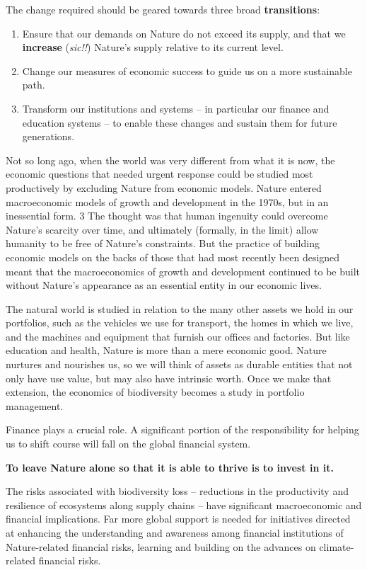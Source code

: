 \documentclass[
]{book}
\begin{document}
The change required should be geared towards three broad \textbf{transitions}:

\begin{enumerate}
\def\labelenumi{(\roman{enumi})}
\item
  Ensure that our demands on Nature do not exceed its supply,
  and that we \textbf{increase} (\emph{sic!!}) Nature's supply relative to its current level.
\item
  Change our measures of economic success to guide us on a
  more sustainable path.
\item
  Transform our institutions and systems -- in particular our
  finance and education systems -- to enable these changes and
  sustain them for future generations.
\end{enumerate}

Not so long ago, when the
world was very different from what it is now, the economic questions that needed urgent
response could be studied most productively by excluding Nature from economic models.
Nature entered macroeconomic models of growth and development in the 1970s, but in an
inessential form. 3 The thought was that human ingenuity could overcome Nature's scarcity over
time, and ultimately (formally, in the limit) allow humanity to be free of Nature's constraints.
But the practice of building economic models on the backs of those that had most recently been
designed meant that the macroeconomics of growth and development continued to be built
without Nature's appearance as an essential entity in our economic lives.

The natural world is studied in relation to the many other assets we
hold in our portfolios, such as the vehicles we use for transport, the homes in which we live,
and the machines and equipment that furnish our offices and factories. But like education and
health, Nature is more than a mere economic good. Nature nurtures and nourishes us, so we
will think of assets as durable entities that not only have use value, but may also have intrinsic
worth. Once we make that extension, the economics of biodiversity becomes a study in portfolio
management.

Finance plays a crucial role. A significant portion of the responsibility for helping us to shift
course will fall on the global financial system.

\textbf{To leave Nature alone so that it is able to thrive is to invest in it.}

The risks associated with biodiversity loss -- reductions in the productivity and resilience of
ecosystems along supply chains -- have significant macroeconomic and financial implications.
Far more global support is needed for initiatives directed at enhancing the understanding and
awareness among financial institutions of Nature-related financial risks, learning and building
on the advances on climate-related financial risks.
\end{document}
